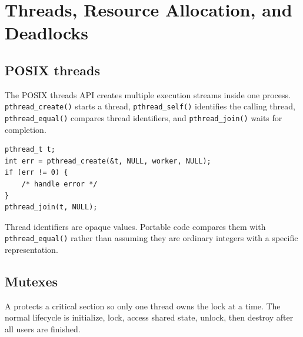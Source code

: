 \chapter{Threads, Resource Allocation, and Deadlocks}\label{ch:deadlock}

\section{POSIX threads}
The POSIX threads API creates multiple execution streams inside one process. \texttt{pthread\_create()} starts a thread, \texttt{pthread\_self()} identifies the calling thread, \texttt{pthread\_equal()} compares thread identifiers, and \texttt{pthread\_join()} waits for completion.

\begin{lstlisting}[style=utpc]
pthread_t t;
int err = pthread_create(&t, NULL, worker, NULL);
if (err != 0) {
    /* handle error */
}
pthread_join(t, NULL);
\end{lstlisting}

\begin{pitfall}
Thread identifiers are opaque values. Portable code compares them with \texttt{pthread\_equal()} rather than assuming they are ordinary integers with a specific representation.
\end{pitfall}

\section{Mutexes}
A  protects a critical section so only one thread owns the lock at a time. The normal lifecycle is initialize, lock, access shared state, unlock, then destroy after all users are finished.

